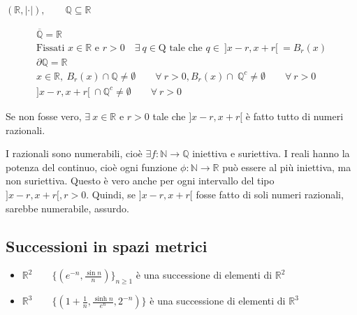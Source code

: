 \begin{exbar}
\begin{example}
	$(\mathbb{R}, |\cdot|), \qquad \mathbb{Q} \subseteq \mathbb{R}$
	
	\begin{gather*}
		\overline{\mathbb{Q}} = \mathbb{R}
		\\
		\text{Fissati } x\in \mathbb{R} \text{ e }  r > 0 \quad \exists \ q \in \mathrm{Q} \text{ tale che }  q \in \ ]x-r, x+r[ \ = B_r(x)
		\\
		\partial \mathbb{Q} = \mathbb{R}
		\\
		x \in \mathbb{R}, \ B_r(x) \cap \mathbb{Q} \neq \emptyset \qquad \forall \ r > 0, B_r(x) \cap \ \mathbb{Q}^c \neq \emptyset \qquad \forall \ r > 0
		\\
		]x-r,x+r[ \ \cap \mathbb{Q}^c \neq \emptyset \qquad \forall \ r > 0
	\end{gather*}
	
	Se non fosse vero, $\exists \ x \in \mathbb{R}$ e $r > 0$ tale che $]x-r, x+r[$ è fatto tutto di numeri razionali.
	
	I razionali sono numerabili, cioè $\exists f: \mathbb{N} \rightarrow \mathbb{Q} $ iniettiva e suriettiva. I reali hanno la potenza del continuo, cioè ogni funzione $\phi: \mathbb{N} \rightarrow \mathbb{R}$ può essere al più iniettiva, ma non suriettiva. Questo è vero anche per ogni intervallo del tipo $]x-r, x+r[, r > 0$. Quindi, se $]x-r, x+r[$ fosse fatto di soli numeri razionali, sarebbe numerabile, assurdo.
\end{example}
\end{exbar}


\subsection{Successioni in spazi metrici}
\begin{exbar}
\begin{itemize}
	\item $\mathbb{R}^2 \qquad \{(e^{-n}, \frac{\sin n}{n}) \}_{n\geq 1}$ è una successione di elementi di $\mathbb{R}^2$
	\item $\mathbb{R}^3 \qquad \{ (1+\frac{1}{n}, \frac{\sinh n}{e^n},2^{-n}) \}$ è una successione di elementi di $\mathbb{R}^3$
\end{itemize}
\end{exbar}


